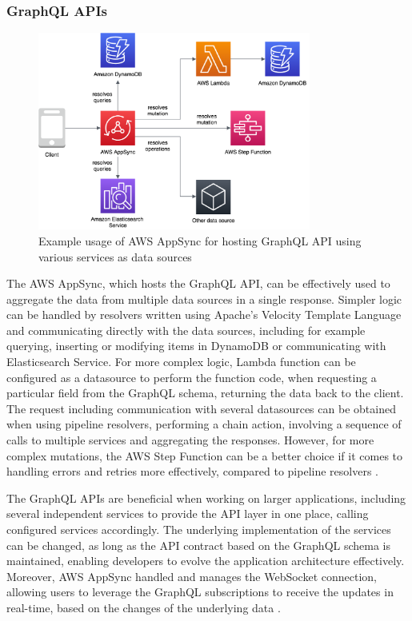\subsubsection{GraphQL APIs} \label{chapter:client-graphql-apis}

\begin{figure}[]
   \centering
   \includegraphics[width=0.8\textwidth]{assets/04-serverless-for-web-apps/graphql.png}
   \caption{Example usage of AWS AppSync for hosting GraphQL API using various services as data sources}
   \label{fig:pattern-graphql-api}
\end{figure}

The AWS AppSync, which hosts the GraphQL API, can be effectively used to aggregate the data from multiple data sources in a single response.
Simpler logic can be handled by resolvers written using Apache’s Velocity Template Language and communicating directly with the data sources, including for example querying, inserting or modifying items in DynamoDB or communicating with Elasticsearch Service.
For more complex logic, Lambda function can be configured as a datasource to perform the function code, when requesting a particular field from the GraphQL schema, returning the data back to the client.
The request including communication with several datasources can be obtained when using pipeline resolvers, performing a chain action, involving a sequence of calls to multiple services and aggregating the responses.
However, for more complex mutations, the AWS Step Function can be a better choice if it comes to handling errors and retries more effectively, compared to pipeline resolvers \cite{ServerlessArchitecturalPatternsAndBestPractices}.

The GraphQL APIs are beneficial when working on larger applications, including several independent services to provide the API layer in one place, calling configured services accordingly.
The underlying implementation of the services can be changed, as long as the API contract based on the GraphQL schema is maintained, enabling developers to evolve the application architecture effectively.
Moreover, AWS AppSync handled and manages the WebSocket connection, allowing users to leverage the GraphQL subscriptions to receive the updates in real-time, based on the changes of the underlying data \cite{DevelopServerlessGraphQLArchitecturesUsingAWSAppSync}.

